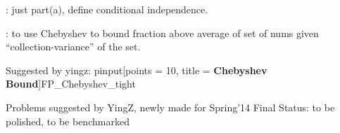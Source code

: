 \documentclass[quiz]{mcs}
\renewcommand{\examspace}[]{}
\begin{document}
\examspace
\begin{editingnotes}
: just part(a), define conditional independence.
\end{editingnotes}

\examspace
{}

\examspace
\begin{editingnotes}
\end{editingnotes}

\examspace
\begin{editingnotes}
: to use Chebyshev to bound fraction above average of
set of nums given ``collection-variance'' of the set.
\end{editingnotes}


\begin{editingnotes}
Suggested by yingz: pinput[points = 10, title = \textbf{Chebyshev Bound}]{FP\_Chebyshev\_tight}
\end{editingnotes}

\examspace
\begin{editingnotes}
Problems suggested by YingZ, newly made for Spring'14 Final
Status: to be polished, to be benchmarked
\end{editingnotes}


\end{document}
